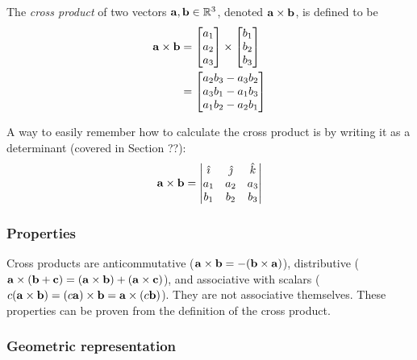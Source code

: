 \documentclass[../main.tex]{subfiles}
\begin{document}
\begin{definition}
	The \textit{cross product} of two vectors $\mathbf{a}, \mathbf{b} \in \mathbb{R}^3$,
	denoted $\mathbf{a}\times\mathbf{b}$, is defined to be
	\begin{align*}
		\mathbf{a}\times\mathbf{b} & = \begin{bmatrix}a_1\\a_2\\a_3\end{bmatrix}\times\begin{bmatrix}b_1\\b_2\\b_3\end{bmatrix} \\
		                       & = \begin{bmatrix}a_2b_3-a_3b_2\\a_3b_1-a_1b_3\\a_1b_2-a_2b_1\end{bmatrix}
	\end{align*}
\end{definition}

\begin{remark}
	A way to easily remember how to calculate the cross product is by writing
	it as a determinant (covered in Section ??):
	\[\mathbf{a}\times\mathbf{b}=\begin{vmatrix}
			\hat{\imath} & \hat{\jmath} & \hat{k} \\
			a_1           & a_2           & a_3      \\
			b_1           & b_2           & b_3
		\end{vmatrix}\]
\end{remark}

\subsubsection{Properties}

Cross products are anticommutative ($\mathbf{a}\times\mathbf{b}=-(\mathbf{b}\times\mathbf{a})$),
distributive ($\mathbf{a}\times(\mathbf{b}+\mathbf{c})=(\mathbf{a}\times\mathbf{b})+(\mathbf{a}\times\mathbf{c})$),
and associative with scalars ($c(\mathbf{a}\times\mathbf{b})=(c\mathbf{a})\times\mathbf{b}=\mathbf{a}\times(c\mathbf{b})$).
They are not associative themselves. These properties can be proven from the definition
of the cross product.

\subsubsection{Geometric representation}
\end{document}
